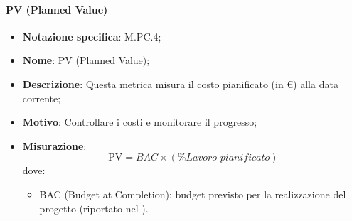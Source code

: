 \paragraph*{PV (Planned Value)}
\begin{itemize}
    \item \textbf{Notazione specifica}: M.PC.4;
    \item \textbf{Nome}: PV (Planned Value);
    \item \textbf{Descrizione}: Questa metrica misura il costo pianificato (in €) alla data corrente;
    \item \textbf{Motivo}: Controllare i costi e monitorare il progresso;
    \item \textbf{Misurazione}:
    \[
        \text{PV} = \textit{BAC} \times (\% {\textit{Lavoro pianificato}})
    \]
    dove:
    \begin{itemize}
        \item BAC (Budget at Completion): budget previsto per la realizzazione del progetto (riportato nel \PianoDiProgetto).
    \end{itemize}
\end{itemize}
